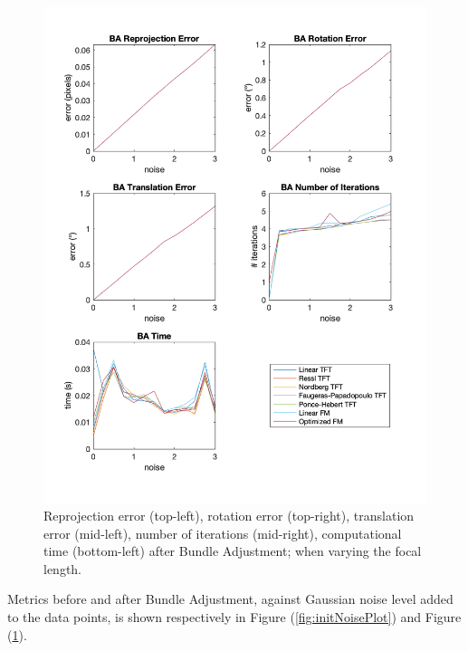 \begin{figure}[p]
	\centering
	\includegraphics[width=1\textwidth]{Experiments/Synthetic/noise/BAnoisePlots.png}
	\caption{Reprojection error (top-left), rotation error (top-right), translation error (mid-left), number of iterations (mid-right), computational time (bottom-left) after Bundle Adjustment; when varying the focal length.}
	\label{fig:BANoisePlot}
\end{figure}

\pagebreak

Metrics before and after Bundle Adjustment, against Gaussian noise level added to the data points, is shown respectively in Figure (\ref{fig:initNoisePlot}) and Figure (\ref{fig:BANoisePlot}).

